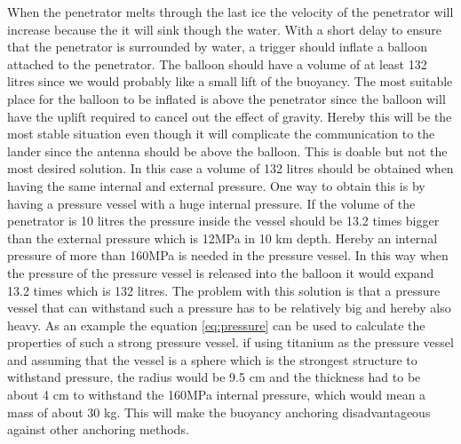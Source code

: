 When the penetrator melts through the last ice the velocity of the penetrator will increase because the it will sink though the water. With a short delay to ensure that the penetrator is surrounded by water, a trigger should inflate a balloon attached to the penetrator. The balloon should have a volume of at least 132 litres since we would probably like a small lift of the buoyancy. The most suitable place for the balloon to be inflated is above the penetrator since the balloon will have the uplift required to cancel out the effect of gravity. Hereby this will be the most stable situation even though it will complicate the communication to the lander since the antenna should be above the balloon. This is doable but not the most desired solution. In this case a volume of 132 litres should be obtained when having the same internal and external pressure. One way to obtain this is by having a pressure vessel with a huge internal pressure. If the volume of the penetrator is 10 litres the pressure inside the vessel should be 13.2 times bigger than the external pressure which is 12MPa in 10 km depth. Hereby an internal pressure of more than 160MPa is needed in the pressure vessel. In this way when the pressure of the pressure vessel is released into the balloon it would expand 13.2 times which is 132 litres. The problem with this solution is that a pressure vessel that can withstand such a pressure has to be relatively big and hereby also heavy. As an example the equation \ref{eq:pressure} can be used to calculate the properties of such a strong pressure vessel.  if using titanium as the pressure vessel and assuming that the vessel is a sphere which is the strongest structure to withstand pressure, the radius would be 9.5 cm and the thickness had to be about 4 cm to withstand the 160MPa internal pressure, which would mean a mass of about 30 kg. This will make the buoyancy anchoring disadvantageous against other anchoring methods. \\


